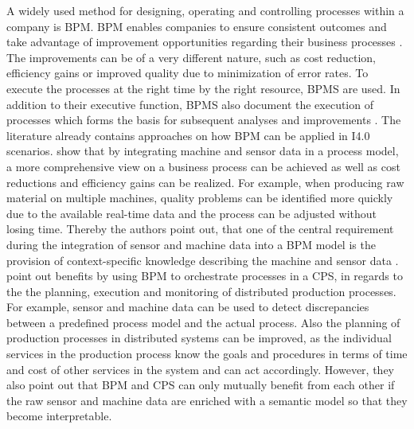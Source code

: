 A widely used method for designing, operating and controlling processes within a company is \ac{BPM}. \ac{BPM} enables companies to ensure consistent outcomes and take advantage of improvement opportunities regarding their business processes \cite[p. 1]{Dumas2018FundamentalManagement}. The improvements can be of a very different nature, such as cost reduction, efficiency gains or improved quality due to minimization of error rates. To execute the processes at the right time by the right resource, \ac{BPMS} are used. In addition to their executive function, \ac{BPMS} also document the execution of processes which forms the basis for subsequent analyses and improvements \cite[p. 345]{Dumas2018FundamentalManagement}. The literature already contains approaches on how BPM can be applied in \ac{I4.0} scenarios. \citet[p. 1444]{Schonig2020IoTExecution} show that by integrating machine and sensor data in a process model, a more comprehensive view on a business process can be achieved as well as cost reductions and efficiency gains can be realized. For example, when producing raw material on multiple machines, quality problems can be identified more quickly due to the available real-time data and the process can be adjusted without losing time. Thereby the authors point out, that one of the central requirement during the integration of sensor and machine data into a BPM model is the provision of context-specific knowledge describing the machine and sensor data \cite[p. 1447]{Schonig2020IoTExecution}. \citet[p. 2]{Jaenisch2017TheChallenges} point out benefits by using \ac{BPM} to orchestrate processes in a \ac{CPS}, in regards to the the planning, execution and monitoring of distributed production processes. For example, sensor and machine data can be used to detect discrepancies between a predefined process model and the actual process. Also the planning of production processes in distributed systems can be improved, as the individual services in the production process know the goals and procedures in terms of time and cost of other services in the system and can act accordingly. However, they also point out that \ac{BPM} and \ac{CPS} can only mutually benefit from each other if the raw sensor and machine data are enriched with a semantic model so that they become interpretable.    

